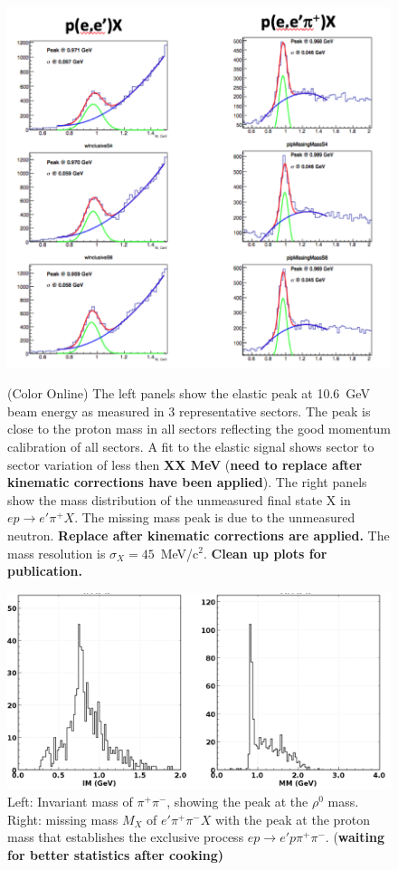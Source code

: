 \documentclass[final,3p,twocolumn]{elsarticle}
\begin{document}
\begin{figure}[t!]
\centerline{\includegraphics[width=1.0\columnwidth]{elastic_pi+n.png}}
\caption{(Color Online) The left panels show the elastic peak at 10.6~GeV beam energy as measured in 3 representative sectors. The
peak is close to the proton mass in all sectors reflecting the good momentum calibration of all sectors. A fit to the
elastic signal shows sector to sector variation of less then {\bf XX MeV} ({\bf need to replace after kinematic
corrections have been applied}). The right panels show the mass distribution of the unmeasured final state X in
$ep \to e'\pi^+ X$. The missing mass peak is due to the unmeasured neutron. {\bf Replace after kinematic corrections are applied.}
The mass resolution is $\sigma_X = 45$~MeV/c$^2$. {\bf Clean up plots for publication.}} 
\label{elastic-peak}

\vspace{0.3cm}\centerline{\includegraphics[width=1.0\columnwidth]{pip-pim-p.png}}
\caption{Left: Invariant mass of $\pi^+\pi^-$, showing the peak at the $\rho^0$ mass. Right: missing mass 
$M_X$  of $e'\pi^+\pi^-X$ with the peak at the proton mass that establishes the exclusive process
$ep\to e' p \pi^+\pi^-$. ({\bf waiting for better statistics after cooking)}}
\label{pip-pim-p}
\end{figure} 
\end{document}
